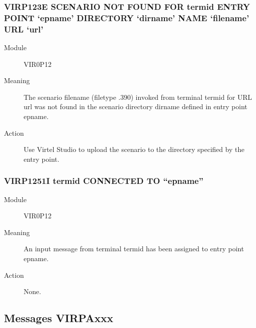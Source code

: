 \documentclass[letterpaper,10pt,english]{sphinxmanual}
\begin{document}
\subsubsection{VIRP123E SCENARIO NOT FOUND FOR termid ENTRY POINT ‘epname’ DIRECTORY ‘dirname’ NAME ‘filename’ URL ‘url’}
\label{\detokenize{messages:virp123e-scenario-not-found-for-termid-entry-point-epname-directory-dirname-name-filename-url-url}}\begin{description}
\item[{Module}] \leavevmode
VIR0P12

\item[{Meaning}] \leavevmode
The scenario filename (filetype .390) invoked from terminal termid for URL url was not found in the scenario directory dirname defined in entry point epname.

\item[{Action}] \leavevmode
Use Virtel Studio to upload the scenario to the directory specified by the entry point.

\end{description}


\subsubsection{VIRP1251I termid CONNECTED TO “epname”}
\label{\detokenize{messages:virp1251i-termid-connected-to-epname}}\begin{description}
\item[{Module}] \leavevmode
VIR0P12

\item[{Meaning}] \leavevmode
An input message from terminal termid has been assigned to entry point epname.

\item[{Action}] \leavevmode
None.

\end{description}


\subsection{Messages VIRPAxxx}
\label{\detokenize{messages:messages-virpaxxx}}
\end{document}
